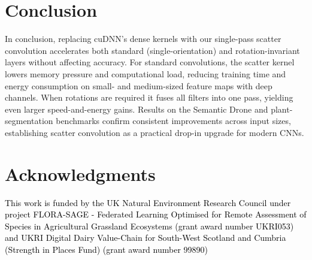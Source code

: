 \section{Conclusion}
In conclusion, replacing cuDNN’s dense kernels with our single-pass scatter convolution accelerates both standard (single-orientation) and rotation-invariant layers without affecting accuracy. For standard convolutions, the scatter kernel lowers memory pressure and computational load, reducing training time and energy consumption on small- and medium-sized feature maps with deep channels.
When rotations are required it fuses all filters into one pass, yielding even larger speed-and-energy gains. Results on the Semantic Drone and plant-segmentation benchmarks confirm consistent improvements across input sizes, establishing scatter convolution as a practical drop-in upgrade for modern CNNs.

\section*{Acknowledgments}
\textcolor{black}{This work is funded by the UK Natural Environment Research Council under project FLORA-SAGE - Federated Learning Optimised for Remote Assessment of Species in Agricultural Grassland Ecosystems (grant award number UKRI053) and UKRI Digital Dairy Value-Chain for South-West Scotland and Cumbria (Strength in Places Fund) (grant award number 99890)}

